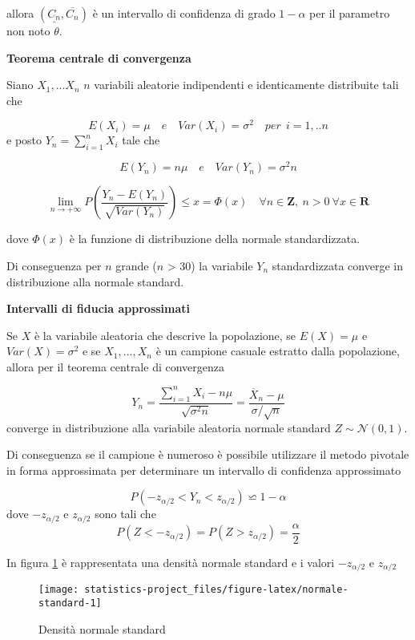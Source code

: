 \documentclass[]{book}
\begin{document}
allora \((\underline{C_n},\overline{C_n})\) è un intervallo di
confidenza di grado \(1 - \alpha\) per il parametro non noto \(\theta\).

\textbf{Teorema centrale di convergenza}

Siano \(X_1,...X_n\) \(n\) variabili aleatorie indipendenti e
identicamente distribuite tali che

\[E(X_i) = \mu \quad e \quad Var(X_i) = \sigma^2 \quad per \ \ i=1,..n\]
e posto \(Y_n = \sum_{i=1}^{n}X_i\) tale che

\[E(Y_n) = n \mu \quad  e \quad Var(Y_n) = \sigma^2 n\]

\[\lim_{n \to +\infty} P \left( \frac{Y_n - E(Y_n)}{\sqrt{Var(Y_n)}} \right) \le x = \Phi(x) \quad \forall n \in \mathbf Z, \ n > 0 \ \forall x \in \mathbf R\]

dove \(\Phi(x)\) è la funzione di distribuzione della normale
standardizzata.

Di conseguenza per \(n\) grande (\(n\) \textgreater{} 30) la variabile
\(Y_n\) standardizzata converge in distribuzione alla normale standard.

\textbf{Intervalli di fiducia approssimati}

Se \(X\) è la variabile aleatoria che descrive la popolazione, se
\(E(X) = \mu\) e \(Var(X) = \sigma^2\) e se \(X_1,...,X_n\) è un
campione casuale estratto dalla popolazione, allora per il teorema
centrale di convergenza

\[Y_n = \frac{\sum_{i=1}^{n}X_i - n\mu}{ \sqrt{\sigma^2 n}} = \frac{\overline X_n - \mu}{\sigma / \sqrt{n}}\]
converge in distribuzione alla variabile aleatoria normale standard
\(Z \sim \mathcal{N}(0, 1)\).

Di conseguenza se il campione è numeroso è possibile utilizzare il
metodo pivotale in forma approssimata per determinare un intervallo di
confidenza approssimato

\[P\left( -z_{\alpha/2} < Y_n < z_{\alpha/2} \right) \backsimeq 1 - \alpha\]
dove \(-z_{\alpha/2}\) e \(z_{\alpha/2}\) sono tali che
\[P(Z < -z_{\alpha/2}) = P(Z > z_{\alpha/2}) = \frac{\alpha}{2}\]

In figura \ref{fig:normale-standard} è rappresentata una densità normale
standard e i valori \(-z_{\alpha/2}\) e \(z_{\alpha/2}\)

\begin{figure}

{\centering \texttt{[image: statistics-project\_files/figure-latex/normale-standard-1]} 

}

\caption{Densità normale standard}\label{fig:normale-standard}
\end{figure}
\end{document}
